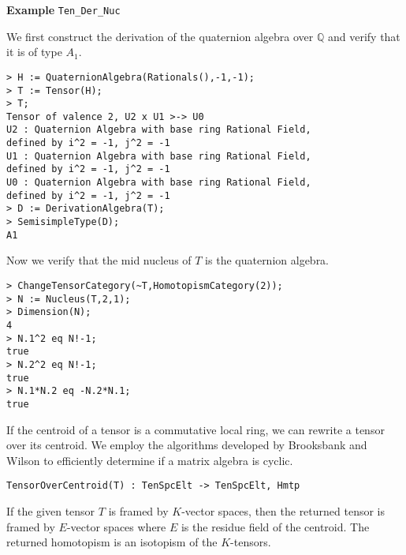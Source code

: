 \begin{framed} {\bf Example} {\tt Ten\_Der\_Nuc}\\
{\small We first construct the derivation of the quaternion algebra over $\mathbb{Q}$ and verify that it is of type $A_1$.
\begin{lstlisting}[frame=single,basicstyle=\ttfamily\color{black!30!
teal},backgroundcolor=\color{white!70!gray}]
> H := QuaternionAlgebra(Rationals(),-1,-1);
> T := Tensor(H);                           
> T;
Tensor of valence 2, U2 x U1 >-> U0
U2 : Quaternion Algebra with base ring Rational Field, 
defined by i^2 = -1, j^2 = -1
U1 : Quaternion Algebra with base ring Rational Field, 
defined by i^2 = -1, j^2 = -1
U0 : Quaternion Algebra with base ring Rational Field, 
defined by i^2 = -1, j^2 = -1
> D := DerivationAlgebra(T);
> SemisimpleType(D);
A1
\end{lstlisting}
Now we verify that the mid nucleus of $T$ is the quaternion algebra.
\begin{lstlisting}[frame=single,basicstyle=\ttfamily\color{black!30!
teal},backgroundcolor=\color{white!70!gray}]
> ChangeTensorCategory(~T,HomotopismCategory(2));
> N := Nucleus(T,2,1);
> Dimension(N);
4
> N.1^2 eq N!-1;
true
> N.2^2 eq N!-1;
true
> N.1*N.2 eq -N.2*N.1;
true
\end{lstlisting}
 }
\end{framed}

If the centroid of a tensor is a commutative local ring, we can rewrite a tensor over its centroid.
We employ the algorithms developed by Brooksbank and Wilson \cite{BW:Module-iso} to efficiently determine if a matrix algebra is cyclic.

\color{blue}
{\small \begin{verbatim}
TensorOverCentroid(T) : TenSpcElt -> TenSpcElt, Hmtp
\end{verbatim} }
\color{black}

If the given tensor $T$ is framed by $K$-vector spaces, then the returned tensor is framed by $E$-vector spaces where $E$ is the residue field of the centroid. 
The returned homotopism is an isotopism of the $K$-tensors.

